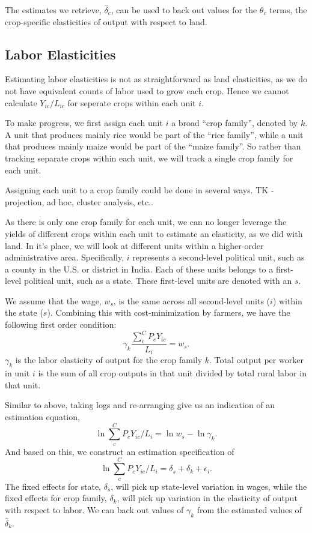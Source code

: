 \documentclass[10pt]{article}
\begin{document}
The estimates we retrieve, $\hat{\delta}_c$, can be used to back out values for the $\theta_c$ terms, the crop-specific elasticities of output with respect to land.

\subsection{Labor Elasticities}
Estimating labor elasticities is not as straightforward as land elasticities, as we do not have equivalent counts of labor used to grow each crop. Hence we cannot calculate $Y_{ic}/L_{ic}$ for seperate crops within each unit $i$.

To make progress, we first assign each unit $i$ a broad ``crop family'', denoted by $k$. A unit that produces mainly rice would be part of the ``rice family'', while a unit that produces mainly maize would be part of the ``maize family''. So rather than tracking separate crops within each unit, we will track a single crop family for each unit. 

Assigning each unit to a crop family could be done in several ways. TK - projection, ad hoc, cluster analysis, etc.. 

As there is only one crop family for each unit, we can no longer leverage the yields of different crops within each unit to estimate an elasticity, as we did with land. In it's place, we will look at different units within a higher-order administrative area. Specifically, $i$ represents a second-level political unit, such as a county in the U.S. or district in India. Each of these units belongs to a first-level political unit, such as a state. These first-level units are denoted with an $s$.

We assume that the wage, $w_s$, is the same across all second-level units ($i$) within the state ($s$). Combining this with cost-minimization by farmers, we have the following first order condition:
\begin{equation}
	\gamma_{k} \frac{\sum_c^C P_c Y_{ic}}{L_i} = w_s.
\end{equation}
$\gamma_k$ is the labor elasticity of output for the crop family $k$. Total output per worker in unit $i$ is the sum of all crop outputs in that unit divided by total rural labor in that unit.

Similar to above, taking logs and re-arranging give us an indication of an estimation equation,
\begin{equation}
	\ln \sum_c^C P_c Y_{ic}/L_i = \ln w_s - \ln \gamma_k.
\end{equation}
And based on this, we construct an estimation specification of
\begin{equation}
	\ln \sum_c^C P_c Y_{ic}/L_i = \delta_s + \delta_k + \epsilon_{i}.
\end{equation}
The fixed effects for state, $\delta_s$, will pick up state-level variation in wages, while the fixed effects for crop family, $\delta_k$, will pick up variation in the elasticity of output with respect to labor. We can back out values of $\gamma_k$ from the estimated values of $\hat{\delta}_k$.
\end{document}
